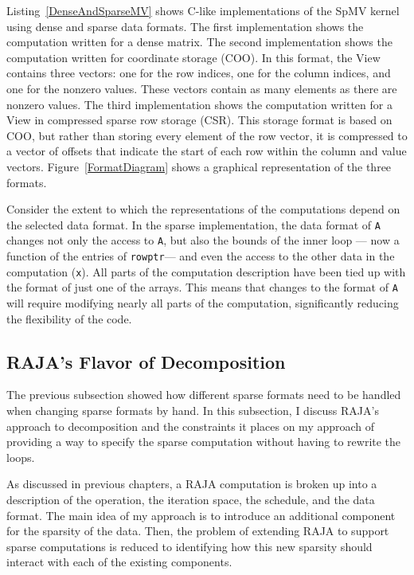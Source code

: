Listing~\ref{DenseAndSparseMV} shows C-like implementations of the SpMV kernel using dense and sparse data formats.
The first implementation shows the computation written for a dense matrix.
The second implementation shows the computation written for coordinate storage (COO). 
In this format, the View contains three vectors: one for the row indices, one for the column indices, and one for the nonzero values.
These vectors contain as many elements as there are nonzero values.
The third implementation shows the computation written for a View in compressed sparse row storage (CSR).
This storage format is based on COO, but rather than storing every element of the row vector, it is compressed to a vector of offsets that indicate the start of each row within the column and value vectors.
Figure~\ref{FormatDiagram} shows a graphical representation of the three formats.



Consider the extent to which the representations of the computations depend on the selected data format.
In the sparse implementation, the data format of \verb.A. changes not only the access to \verb.A., but also the bounds of the inner loop --- now a function of the entries of \verb.rowptr.--- and even the access to the other data in the computation (\verb.x.).
All parts of the computation description have been tied up with the format of just one of the arrays.
This means that changes to the format of \verb.A. will require modifying nearly all parts of the computation, significantly reducing the flexibility of the code.


\subsection{RAJA's Flavor of Decomposition}
The previous subsection showed how different sparse formats need to be handled when changing sparse formats by hand.  
In this subsection, I discuss RAJA's approach to decomposition and the constraints it places on my approach of providing a way to specify the sparse computation without having to rewrite the loops.

As discussed in previous chapters, a RAJA computation is broken up into a description of the operation, the iteration space, the schedule, and the data format.
The main idea of my approach is to introduce an additional component for the sparsity of the data.
Then, the problem of extending RAJA to support sparse computations is reduced to identifying how this new sparsity should interact with each of the existing components.

